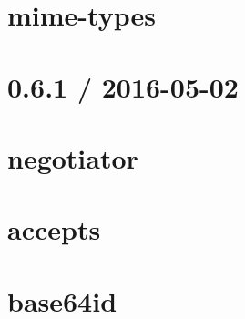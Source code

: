 \documentclass[twoside]{book}
\newcommand{\+}{\discretionary{\mbox{\scriptsize$\hookleftarrow$}}{}{}}
\begin{document}
\chapter{mime-\/types}
\label{md_bin_node_modules_socket_8io_node_modules_engine_8io_node_modules_accepts_node_modules_mime-types__r_e_a_d_m_e}

\chapter{0.6.1 / 2016-\/05-\/02}
\label{md_bin_node_modules_socket_8io_node_modules_engine_8io_node_modules_accepts_node_modules_negotiator__h_i_s_t_o_r_y}

\chapter{negotiator}
\label{md_bin_node_modules_socket_8io_node_modules_engine_8io_node_modules_accepts_node_modules_negotiator__r_e_a_d_m_e}

\chapter{accepts}
\label{md_bin_node_modules_socket_8io_node_modules_engine_8io_node_modules_accepts__r_e_a_d_m_e}

\chapter{base64id}
\label{md_bin_node_modules_socket_8io_node_modules_engine_8io_node_modules_base64id__r_e_a_d_m_e}

\end{document}

